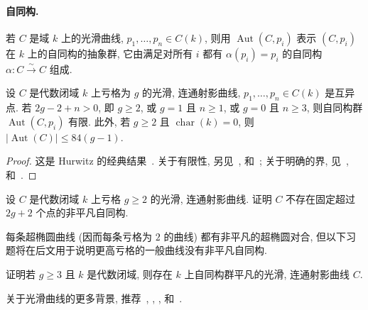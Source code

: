 \paragraph{自同构.}
若 $C$ 是域 $k$ 上的光滑曲线, $p_1,\allowbreak \ldots,\allowbreak p_n\in C(k)$, 则用 $\operatorname{Aut}(C,\allowbreak p_i)$ 表示 $(C,\allowbreak p_i)$ 在 $k$ 上的自同构的抽象群, 它由满足对所有 $i$ 都有 $\alpha(p_i)=p_i$ 的自同构 $\alpha:C\xrightarrow{\sim}C$ 组成.
\begin{proposition}\label{src:6.1.8}
设 $C$ 是代数闭域 $k$ 上亏格为 $g$ 的光滑, 连通射影曲线, $p_1,\allowbreak \ldots,\allowbreak p_n\in C(k)$ 是互异点. 若 $2g-2+n>0$, 即 $g\geq2$, 或 $g=1$ 且 $n\geq1$, 或 $g=0$ 且 $n\geq3$, 则自同构群 $\operatorname{Aut}(C,\allowbreak p_i)$ 有限. 此外, 若 $g\geq2$ 且 $\operatorname{char}(k)=0$, 则 $|\operatorname{Aut}(C)|\leq84(g-1)$.
\end{proposition}
\begin{proof}
这是 Hurwitz 的经典结果~\cite{Hur92}. 关于有限性, 另见~\cite[习题 IV.5.2]{Har77}, \cite[习题 I.F.4]{ACGH85} 和~\cite[定理 4.18]{Mir95}; 关于明确的界, 见~\cite[习题 IV.2.5]{Har77}, \cite[习题 I.F.10]{ACGH85} 和~\cite[定理 3.9]{Mir95}.
\end{proof}
\begin{exercise}\label{src:6.1.9}
设 $C$ 是代数闭域 $k$ 上亏格 $g\geq2$ 的光滑, 连通射影曲线. 证明 $C$ 不存在固定超过 $2g+2$ 个点的非平凡自同构.
\end{exercise}
每条超椭圆曲线 (因而每条亏格为 $2$ 的曲线) 都有非平凡的超椭圆对合, 但以下习题将在后文用于说明更高亏格的一般曲线没有非平凡自同构.
\begin{exercise}\label{src:6.1.10}
证明若 $g\geq3$ 且 $k$ 是代数闭域, 则存在 $k$ 上自同构群平凡的光滑, 连通射影曲线 $C$.
\end{exercise}
关于光滑曲线的更多背景, 推荐~\cite[\S IV]{Har77}, \cite[\S 20]{Vak17}, \cite[\S 7]{Liu02}, \cite{ACGH85} 和~\cite{Mir95}.

